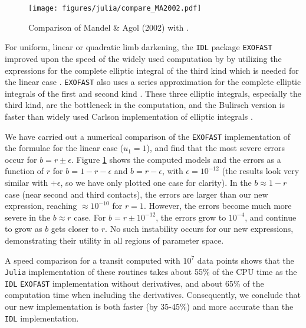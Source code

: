\documentclass[modern,trackchanges]{aastex63}
\begin{document}
\begin{figure}[t!]
    \begin{centering}
    \texttt{[image: figures/julia/compare\_MA2002.pdf]}
    \caption{Comparison of Mandel \& Agol (2002) with \thiswork.
    \label{fig:compareMA}}
    \end{centering}
\end{figure}

For uniform, linear or quadratic limb darkening, the \texttt{IDL} package \texttt{EXOFAST} 
improved upon the speed of the widely used computation by \citet{MandelAgol2002} 
by utilizing the \citet{Bulirsch1965a,Bulirsch1965b} expressions for the complete 
elliptic integral of the third kind which is needed for the linear case
\citep{Eastman2013}.  \texttt{EXOFAST} also uses a series
approximation for the complete elliptic integrals of the first and second
kind \citep{Hastings1955}. These three elliptic integrals, especially the third
kind, are the bottleneck in the computation, and the Bulirsch version is faster
than widely used Carlson implementation of elliptic integrals \citep{Carlson1979}.

We have carried out a numerical comparison of the \texttt{EXOFAST} implementation
of the \citet{MandelAgol2002} formulae for the linear case ($u_1=1$), and find 
that the most severe errors occur for $b = r \pm \epsilon$.  Figure \ref{fig:compareMA} 
shows the computed models and the errors as a function of $r$ for $b=1-r-\epsilon$
and $b=r-\epsilon$, with $\epsilon = 10^{-12}$ (the results look very
similar with $+\epsilon$, so we have only plotted one case for clarity).
In the $b\approx 1-r$ case (near second and third contacts), the errors
are larger than our new expression, reaching $\approx 10^{-10}$ for
$r = 1$.  However, the errors become much more severe in the $b \approx r$
case.  For $b=r \pm 10^{-12}$, the errors grow to $10^{-4}$, and continue
to grow as $b$ gets closer to $r$.  No such instability occurs for
our new expressions, demonstrating their utility in all regions of
parameter space.

A speed comparison for a transit computed with $10^7$ data points shows that
the \texttt{Julia} implementation of these routines takes about 55\% of the CPU
time as the \texttt{IDL} \texttt{EXOFAST} implementation without derivatives, and about 65\%
of the computation time when including the derivatives.  Consequently, we
conclude that our new implementation is both faster (by 35-45\%) and more
accurate than the \cite{MandelAgol2002} \texttt{IDL} implementation.  
\end{document}
